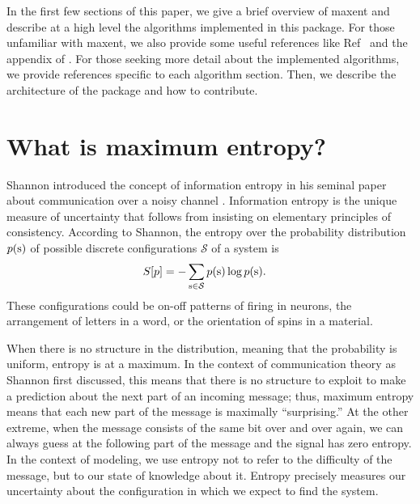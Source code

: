 \documentclass{jors}
\begin{document}

In the first few sections of this paper, we give a brief overview of maxent and describe at a high level the algorithms implemented in this package. For those unfamiliar with maxent, we also provide some useful references like Ref~\cite{Bialek:2012ueb} and the appendix of \cite{Lee:2015ev}. For those seeking more detail about the implemented algorithms, we provide references specific to each algorithm section. Then, we describe the architecture of the package and how to contribute.

\section*{What is maximum entropy?}
Shannon introduced the concept of information entropy in his seminal paper about communication over a noisy channel \cite{Shannon:1948wk}. Information entropy is the unique measure of uncertainty that follows from insisting on elementary principles of consistency. According to Shannon, the entropy over the probability distribution $p({\rm s})$ of possible discrete configurations $\mathcal S$ of a system is
\begin{align}
	S[p] &= -\sum_{{\rm s}\in \mathcal{S}} p({\rm s}) \log p({\rm s}).
\end{align}
These configurations could be on-off patterns of firing in neurons, the arrangement of letters in a word, or the orientation of spins in a material.

When there is no structure in the distribution, meaning that the probability is uniform, entropy is at a maximum. In the context of communication theory as Shannon first discussed, this means that there is no structure to exploit to make a prediction about the next part of an incoming message; thus, maximum entropy means that each new part of the message is maximally ``surprising.'' At the other extreme, when the message consists of the same bit over and over again, we can always guess at the following part of the message and the signal has zero entropy. In the context of modeling, we use entropy not to refer to the difficulty of the message, but to our state of knowledge about it. Entropy precisely measures our uncertainty about the configuration in which we expect to find the system.
\end{document}
